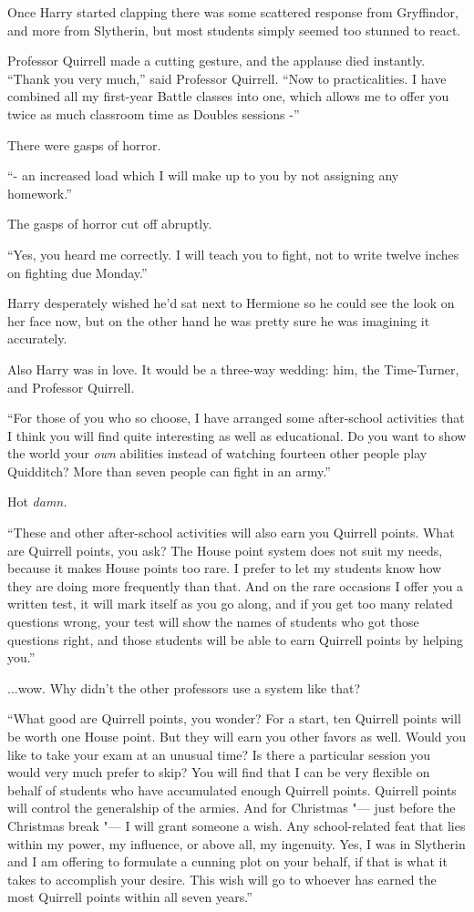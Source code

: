Once Harry started clapping there was some scattered response from
Gryffindor, and more from Slytherin, but most students simply seemed too
stunned to react.

Professor Quirrell made a cutting gesture, and the applause died
instantly. ``Thank you very much,'' said Professor Quirrell. ``Now to
practicalities. I have combined all my first-year Battle classes into
one, which allows me to offer you twice as much classroom time as
Doubles sessions -''

There were gasps of horror.

``- an increased load which I will make up to you by not assigning any
homework.''

The gasps of horror cut off abruptly.

``Yes, you heard me correctly. I will teach you to fight, not to write
twelve inches on fighting due Monday.''

Harry desperately wished he'd sat next to Hermione so he could see the
look on her face now, but on the other hand he was pretty sure he was
imagining it accurately.

Also Harry was in love. It would be a three-way wedding: him, the
Time-Turner, and Professor Quirrell.

``For those of you who so choose, I have arranged some after-school
activities that I think you will find quite interesting as well as
educational. Do you want to show the world your \emph{own} abilities
instead of watching fourteen other people play Quidditch? More than
seven people can fight in an army.''

Hot \emph{damn.}

``These and other after-school activities will also earn you Quirrell
points. What are Quirrell points, you ask? The House point system does
not suit my needs, because it makes House points too rare. I prefer to
let my students know how they are doing more frequently than that. And
on the rare occasions I offer you a written test, it will mark itself as
you go along, and if you get too many related questions wrong, your test
will show the names of students who got those questions right, and those
students will be able to earn Quirrell points by helping you.''

...wow. Why didn't the other professors use a system like that?

``What good are Quirrell points, you wonder? For a start, ten Quirrell
points will be worth one House point. But they will earn you other
favors as well. Would you like to take your exam at an unusual time? Is
there a particular session you would very much prefer to skip? You will
find that I can be very flexible on behalf of students who have
accumulated enough Quirrell points. Quirrell points will control the
generalship of the armies. And for Christmas "--- just before the Christmas
break "--- I will grant someone a wish. Any school-related feat that lies
within my power, my influence, or above all, my ingenuity. Yes, I was in
Slytherin and I am offering to formulate a cunning plot on your behalf,
if that is what it takes to accomplish your desire. This wish will go to
whoever has earned the most Quirrell points within all seven years.''

